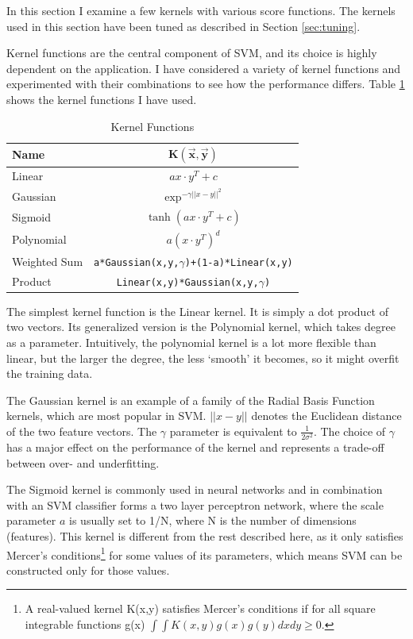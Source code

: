 \documentclass[12pt,notitlepage,twoside]{scrbook}
\begin{document}
In this section I examine a few kernels with various score functions. 
The kernels used in this section have been tuned as described in Section \ref{sec:tuning}.

Kernel functions are the central component of SVM, and its
choice is highly dependent on the application. I have considered a variety of
kernel functions and experimented with their combinations to see how the
performance differs. Table \ref{kfun} shows the kernel functions I have used.

\begin{table}[h]
\begin{center}
\begin{tabular}{|l|c|}
  \hline
  \textbf{Name} &\( \bm{K(\vec{x},\vec{y})}\)\\
  \hline\hline
  Linear  & \(ax\cdot y^T + c\)\\  
\hline
Gaussian  & \(\exp^{-\gamma ||x-y||^2}\)\\
\hline
Sigmoid   &   \(\tanh(ax \cdot y^T + c)\)\\
\hline
Polynomial& \(a(x\cdot y^T)^d\)  \\
\hline
Weighted Sum&  \texttt{a*Gaussian(x,y,\(\gamma\))+(1-a)*Linear(x,y)}\\
\hline
Product     & \texttt{Linear(x,y)*Gaussian(x,y,\(\gamma\))}\\
\hline
\end{tabular}
\end{center}
\caption{Kernel Functions \label{kfun}}
\end{table}

The simplest kernel function is the Linear kernel. It is simply a dot product
of two vectors. Its generalized version is the Polynomial kernel, which takes
degree as a parameter. Intuitively, the polynomial kernel is a lot more
flexible than linear, but the larger the degree, the less `smooth' it becomes,
so it might overfit the training data.  

The Gaussian kernel is an example of a family of the Radial Basis Function kernels, which
are
most popular in SVM. \(||x-y||\) denotes the
Euclidean distance of the two feature vectors. The \(\gamma\) parameter is
equivalent to \(\frac{1}{2\sigma^2}\). The choice of \(\gamma\) has a major
effect on the performance of the kernel and represents a trade-off between over-
and underfitting. 

The Sigmoid kernel is commonly used in neural networks
and in combination with an SVM classifier forms a two layer perceptron network,
where the scale parameter \(a\) is usually set to 1/N, where N is the number of
dimensions (features)\cite{sigmoid}. This kernel is different from the rest described
here, as it only satisfies Mercer's conditions\footnote{A real-valued kernel K(x,y) satisfies
Mercer's conditions if for all square integrable functions g(x) \(\int\int
K(x,y)g(x)g(y)dxdy\geq 0.\)} for some values of its parameters, which
	means SVM can be constructed only for those values\cite{stat_learn}.
\end{document}
